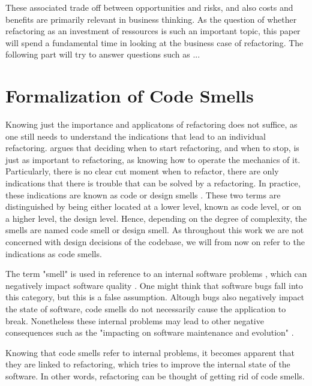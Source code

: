 These associated trade off between opportunities and risks, 
	and also costs and benefits are 
	primarily relevant in business thinking. 
As the question of whether refactoring 
	as an investment of ressources is such an important topic, 
	this paper will spend a fundamental time 
	in looking at the business case of refactoring.
The following part will try to answer questions such as ...



\section{Formalization of Code Smells}

Knowing just the importance and applicatons of refactoring does not suffice, 
	as one still needs to understand the indications 
	that lead to an individual refactoring.
\textcite{fowler2018} argues that deciding when to start refactoring,
	and when to stop,
	is just as important to refactoring,
	as knowing how to operate the mechanics of it.
Particularly, there is no clear cut moment when to refactor, 
	there are only indications 
	that there is trouble that can be solved by a refactoring.
In practice, 
	these indications are known as code or design smells 
	\cite[p.~2]{lacerda2020}.
These two terms are distinguished by being either located at a lower level,
	known as code level, or on a higher level, 
	the design level. 
Hence, 
	depending on the degree of complexity, 
	the smells are named code smell or design smell.
As throughout this work we are not concerned 
	with design decisions of the codebase, 
	we will from now on refer to the indications as code smells.

The term "smell" is used in reference to an internal software problems
	\textcite[p.~2]{lacerda2020}, 
	which can negatively impact software quality 
	\cite[p.~1]{sonnleithner2021}. 
One might think that software bugs fall into this category, 
	but this is a false assumption.
Altough bugs also negatively impact the state of software, 
	code smells do not necessarily cause the application to break.
Nonetheless these internal problems may lead to other negative consequences
	such as the "impacting on software maintenance and evolution"
	\cite[p.~2]{lacerda2020}.
 

Knowing that code smells refer to internal problems,
	it becomes apparent that they are linked to refactoring, 
	which tries to improve the internal state of the software.
In other words, 
	refactoring can be thought of getting rid of code smells. 

